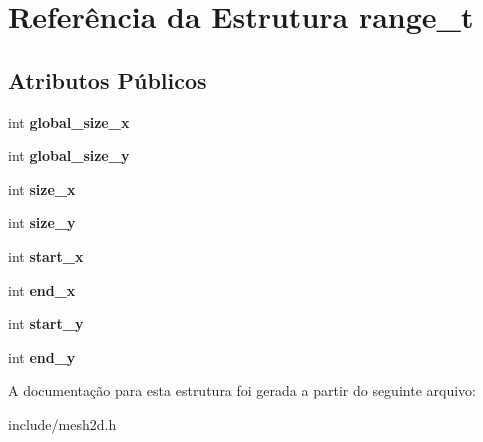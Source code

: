 \hypertarget{structrange__t}{
\section{Referência da Estrutura range\_\-t}
\label{structrange__t}
}
\subsection*{Atributos Públicos}
\begin{DoxyCompactItemize}
\item 
\hypertarget{structrange__t_a5ea3664906d3f611a43c83ce3adbf242}{
int {\bfseries global\_\-size\_\-x}}
\label{structrange__t_a5ea3664906d3f611a43c83ce3adbf242}

\item 
\hypertarget{structrange__t_a303671d57d157d32192783f91f8d09cb}{
int {\bfseries global\_\-size\_\-y}}
\label{structrange__t_a303671d57d157d32192783f91f8d09cb}

\item 
\hypertarget{structrange__t_a3df404e443197e58b6a155ecae24e89e}{
int {\bfseries size\_\-x}}
\label{structrange__t_a3df404e443197e58b6a155ecae24e89e}

\item 
\hypertarget{structrange__t_aa03e3539dab6b784829ed6b406b08283}{
int {\bfseries size\_\-y}}
\label{structrange__t_aa03e3539dab6b784829ed6b406b08283}

\item 
\hypertarget{structrange__t_aad8d0d6e68c9222106d2c1abac0c9d73}{
int {\bfseries start\_\-x}}
\label{structrange__t_aad8d0d6e68c9222106d2c1abac0c9d73}

\item 
\hypertarget{structrange__t_a3621df6abbd38b1124beb62a09ef0e28}{
int {\bfseries end\_\-x}}
\label{structrange__t_a3621df6abbd38b1124beb62a09ef0e28}

\item 
\hypertarget{structrange__t_a4eb29fbdf83b3f20f39ee36a10d2e455}{
int {\bfseries start\_\-y}}
\label{structrange__t_a4eb29fbdf83b3f20f39ee36a10d2e455}

\item 
\hypertarget{structrange__t_a19cfd891eb67f4f2c414a14c804028b5}{
int {\bfseries end\_\-y}}
\label{structrange__t_a19cfd891eb67f4f2c414a14c804028b5}

\end{DoxyCompactItemize}


A documentação para esta estrutura foi gerada a partir do seguinte arquivo:\begin{DoxyCompactItemize}
\item 
include/mesh2d.h\end{DoxyCompactItemize}
